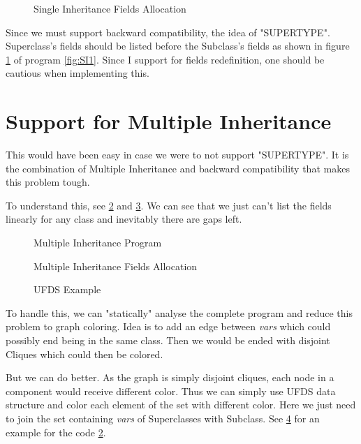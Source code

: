\begin{figure}
\centering
{}
\caption{Single Inheritance Fields Allocation}
\label{fig:SI2}
\end{figure}

Since we must support backward compatibility, the idea of "SUPERTYPE". Superclass's fields should be listed before the Subclass's fields as shown in figure \ref{fig:SI2} of program \ref{fig:SI1}. Since I support for fields redefinition, one should be cautious when implementing this.

\section{Support for Multiple Inheritance}

This would have been easy in case we were to not support "SUPERTYPE". It is the combination of Multiple Inheritance and backward compatibility that makes this problem tough. 

To understand this, see \ref{fig:MI1} and \ref{fig:MI2}. We can see that we just can't list the fields linearly for any class and inevitably there are gaps left. 

\begin{figure}
\centering
{}
\caption{Multiple Inheritance Program}
\label{fig:MI1}
\end{figure}

\begin{figure}
\centering
{}
\caption{Multiple Inheritance Fields Allocation}
\label{fig:MI2}
\end{figure}

\begin{figure}
\centering
{}
\caption{UFDS Example}
\label{fig:MI3}
\end{figure}

To handle this, we can "statically" analyse the complete program and reduce this problem to graph coloring. Idea is to add an edge between \textit{vars} which could possibly end being in the same class. Then we would be ended with disjoint Cliques which could then be colored. 

But we can do better. As the graph is simply disjoint cliques, each node in a component would receive different color. Thus we can simply use UFDS data structure and color each element of the set with different color. Here we just need to join the set containing \textit{vars} of Superclasses with Subclass. See \ref{fig:MI3} for an example for the code \ref{fig:MI1}.

